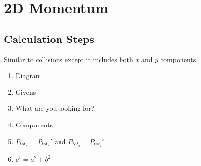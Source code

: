 \documentclass{article}
\begin{document}
\section{2D Momentum}
\begin{adjustwidth}{1cm}{0pt}
    \subsection*{Calculation Steps}
    \begin{flushleft}
        Similar to collisions except it includes both $x$ and $y$ components.
    \end{flushleft}
    \vspace*{5pt}
    \begin{adjustwidth}{0.5cm}{0pt}
        \begin{enumerate}
            \item Diagram
            \item Givens
            \item What are you looking for?
            \item Components
            \item $P_{tot_{x}} = P_{tot_{x}}\prime$ and $P_{tot_{y}} = P_{tot_{y}}\prime$
            \item $c^2 = a^2 + b^2$
        \end{enumerate}
    \end{adjustwidth}
\end{adjustwidth}
\end{document}
